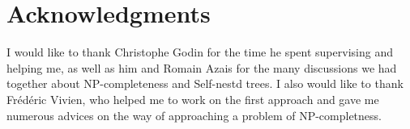 \section*{Acknowledgments}

I would like to thank Christophe Godin for the time he spent
supervising and helping me, as well as him and Romain Azais for the
many discussions we had together about NP-completeness and Self-nestd
trees. I also would like to thank Frédéric Vivien, who helped me to
work on the first approach and gave me numerous advices on the way of
approaching a problem of NP-completness. 
